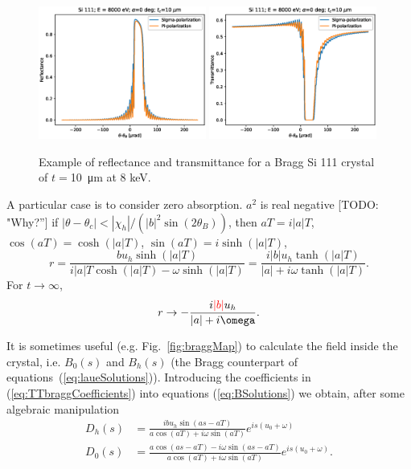 \documentclass{iucr}
\newcommand{\todo}[1]{{\color{red}[TODO: "#1'']}}
\newcommand{\inblue}[1]{{\color{blue}#1}}
\newcommand{\cyan}[1]{{\color{cyan(process)}#1}}
\newcommand{\inred}[1]{{\color{red}#1}}
\begin{document}
\begin{figure}\label{fig:braggProfiles}
    \centering
    \includegraphics[width=0.49\textwidth]{figures/Bragg_1.eps}
    \includegraphics[width=0.49\textwidth]{figures/Bragg_2.eps}
    \caption{Example of reflectance and transmittance for a Bragg Si 111 crystal of $t=$\SI{10}{\micro\meter} at 8 keV. }
\end{figure}


\inblue{A particular case is to consider zero absorption. 
$a^2$ is real negative \todo{Why?} if $|\theta-\theta_c|<|\chi_h|/(|b|^2 \sin(2 \theta_B))$, then $aT=i |a| T$, $\cos(a T)=\cosh(|a|T)$, $\sin(a T)=i \sinh(|a|T)$, 
\begin{equation}
    r = \frac{b u_h \sinh(|a|T)}{i |a|T \cosh(|a|T)- \omega
    \sinh(|a|T)}=
\frac{i |b| u_h \tanh(|a|T)}{|a|+ i \omega \tanh(|a|T)}.
\end{equation}
For $t \rightarrow \infty$, 
\begin{equation}
    r \rightarrow - \frac{i \inred{|b|} u_h}{|a|+ i \omega} .
\end{equation}
}

It is \cyan{sometimes useful (e.g. Fig.~\ref{fig:braggMap})} to calculate the field inside the crystal, i.e. $B_0(s)$ and $B_h(s)$ \cyan{(the Bragg counterpart of equations~(\ref{eq:laueSolutions}))}. Introducing the coefficients in (\ref{eq:TTbraggCoefficients}) into equations (\ref{eq:BSolutions}) we obtain, after some algebraic manipulation
\begin{subequations}\label{eq:bragginside}
\begin{align}
D_h(s)&=\frac{i b u_h \sin(as - aT)}{a \cos(aT) + i \omega \sin(aT)} e^{is(u_0+\omega)}\\
D_0(s)&= \frac{a \cos(as-aT) - i \omega \sin(as-aT)}{a \cos(aT) + i \omega \sin(aT)} e^{is(u_0+\omega)}.
\end{align}
\end{subequations}
\end{document}

